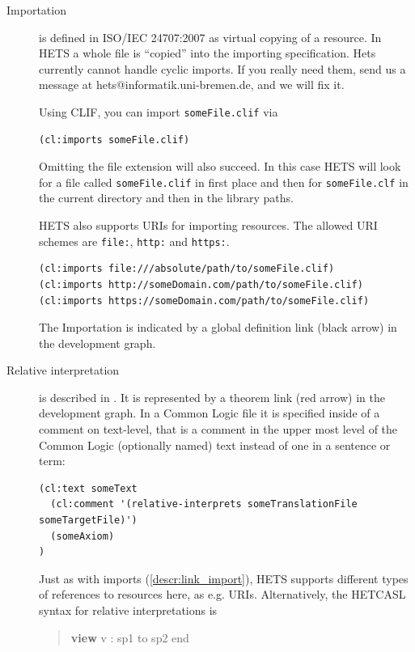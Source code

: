 \documentclass{article}
\newcommand{\normalTEXTSC}[2]{{#1\scriptsize#2}}
\newcommand     {\Hets}{\normalTEXTSC{H}{ETS}\xspace}
\newcommand{\HetCASL}{\normalTEXTSC{H}{ET}\normalTEXTSC{C}{ASL}\xspace}
\begin{document}
\begin{description}
\item[Importation] \label{descr:link_import}
  is defined in ISO/IEC 24707:2007 \cite{iso24a} as virtual copying of a 
  resource. In \Hets a whole file is ``copied'' into the importing  
  specification. Hets currently cannot handle cyclic imports. If you really need
  them, send us a message at hets@informatik.uni-bremen.de, and we will fix it.
  
  Using CLIF, you can import \texttt{someFile.clif} via
  \begin{lstlisting}[language=clif]
(cl:imports someFile.clif)
  \end{lstlisting}
  Omitting the file extension will also succeed. In this case \Hets will look 
  for a file called \texttt{someFile.clif} in first place and then for 
  \texttt{someFile.clf} in the current directory and then in the library paths.

  \Hets also supports URIs for importing resources. The allowed URI schemes are
  \texttt{file:}, \texttt{http:} and \texttt{https:}.
  \begin{lstlisting}[language=clif]
(cl:imports file:///absolute/path/to/someFile.clif)
(cl:imports http://someDomain.com/path/to/someFile.clif)
(cl:imports https://someDomain.com/path/to/someFile.clif)
  \end{lstlisting}

  The Importation is indicated by a global definition link (black arrow) in the 
  development graph.

\item[Relative interpretation]
  is described in \cite{colore-fois}. It is represented by a theorem link 
  (red arrow) in the development graph. In a Common Logic file it is specified 
  inside of a comment on text-level, that is a comment in the upper most level 
  of the Common Logic (optionally named) text instead of one in a sentence or 
  term:
  
  \begin{lstlisting}[language=clif]
(cl:text someText
  (cl:comment '(relative-interprets someTranslationFile someTargetFile)')
  (someAxiom)
)
  \end{lstlisting}
  Just as with imports (\ref{descr:link_import}), \Hets supports different types 
  of references to resources here, as e.g. URIs.
  Alternatively, the \HetCASL syntax for relative interpretations is
\begin{quote}
\textbf{view} v : sp1 to sp2 end
\end{quote}



\end{description}
\end{document}
